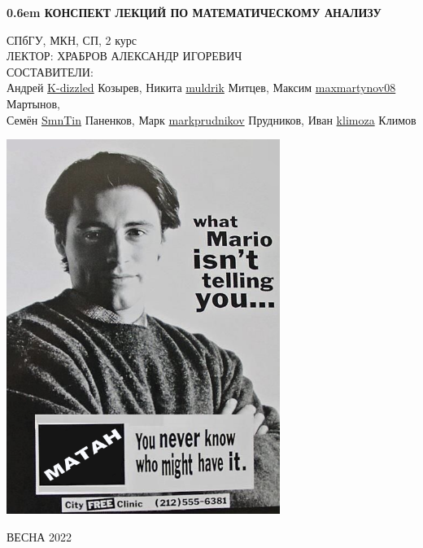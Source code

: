 \documentclass[12pt,letterpaper]{report}
\theoremstyle{definition}
\begin{document}
\clearpage
\newcommand\nbvspace[1][3]{\vspace*{\stretch{#1}}}
\newcommand\nbstretchyspace{\spaceskip0.5em plus 0.25em minus 0.25em}
\newcommand{\nbtitlestretch}{\spaceskip0.6em}
\pagestyle{empty}
\begin{center}
\bfseries
\nbvspace[1]
\Huge
{\nbtitlestretch\huge
КОНСПЕКТ ЛЕКЦИЙ ПО МАТЕМАТИЧЕСКОМУ АНАЛИЗУ}

\nbvspace[1]
\normalsize

СПбГУ, МКН, СП, 2 курс\\
ЛЕКТОР: ХРАБРОВ АЛЕКСАНДР ИГОРЕВИЧ
\nbvspace[1]
\\
\Large СОСТАВИТЕЛИ:\\[0.5em]
\footnotesize
Андрей \href{https://github.com/K-dizzled}{K-dizzled} Козырев,
Никита  \href{https://github.com/muldrik}{muldrik} Митцев,
Максим \href{https://github.com/maxmartynov08}{maxmartynov08} Мартынов,\\
Семён \href{https://github.com/SmnTin}{SmnTin} Паненков,
Марк \href{https://github.com/markprudnikov}{markprudnikov} Прудников,
Иван \href{https://github.com/klimoza}{klimoza} Климов

\nbvspace[2]

\includegraphics[width=3.5in]{./images/matan03.png}
\nbvspace[3]
\normalsize

\large
ВЕСНА 2022
\nbvspace[1]
\end{center}
\end{document}
